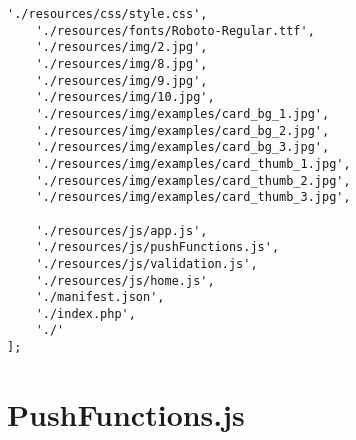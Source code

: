 \begin{lstlisting}[caption={Service Worker Konfiguration - Ressourcen für Caching},label={lst_a3_sw-caching}, frame=single]
    './resources/css/style.css',
    './resources/fonts/Roboto-Regular.ttf',
    './resources/img/2.jpg',
    './resources/img/8.jpg',
    './resources/img/9.jpg',
    './resources/img/10.jpg',
    './resources/img/examples/card_bg_1.jpg',
    './resources/img/examples/card_bg_2.jpg',
    './resources/img/examples/card_bg_3.jpg',
    './resources/img/examples/card_thumb_1.jpg',
    './resources/img/examples/card_thumb_2.jpg',
    './resources/img/examples/card_thumb_3.jpg',

    './resources/js/app.js',
    './resources/js/pushFunctions.js',
    './resources/js/validation.js',
    './resources/js/home.js',
    './manifest.json',
    './index.php',
    './'
];
\end{lstlisting}

\newpage
\section{PushFunctions.js}
\label{sec_a3_sw-push-functions}


